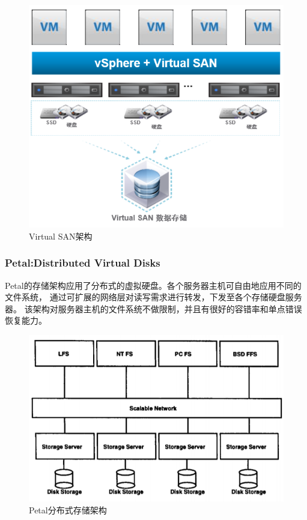 \begin{figure}
\centering
\includegraphics[scale=0.8]{Figures/storage/virtualSAN_architecture.jpg}
\decoRule
\caption{Virtual SAN架构}
\label{fig:virtualSAN_architecture}
\end{figure}
\subsubsection{Petal:Distributed Virtual Disks}
Petal\cite{lee1996petal}的存储架构应用了分布式的虚拟硬盘。各个服务器主机可自由地应用不同的文件系统，
通过可扩展的网络层对读写需求进行转发，下发至各个存储硬盘服务器。
该架构对服务器主机的文件系统不做限制，并且有很好的容错率和单点错误恢复能力。
\begin{figure}
\centering
\includegraphics[scale=0.8]{Figures/storage/dvd_architecture.jpg}
\decoRule
\caption{Petal分布式存储架构}
\label{fig:dvd_architecture}
\end{figure}
